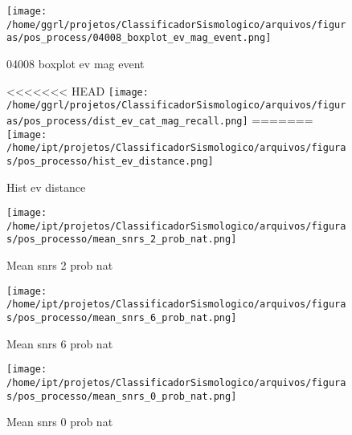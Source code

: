                     \begin{figure}[H]
                        \centering
                        \texttt{[image: /home/ggrl/projetos/ClassificadorSismologico/arquivos/figuras/pos\_process/04008\_boxplot\_ev\_mag\_event.png]}
                        \caption{04008 boxplot ev mag event}
                        \label{fig:04008_boxplot_ev_mag_event}
                    \end{figure}
                

                    \begin{figure}[H]
                        \centering
<<<<<<< HEAD
                        \texttt{[image: /home/ggrl/projetos/ClassificadorSismologico/arquivos/figuras/pos\_process/dist\_ev\_cat\_mag\_recall.png]}
=======
                        \texttt{[image: /home/ipt/projetos/ClassificadorSismologico/arquivos/figuras/pos\_processo/hist\_ev\_distance.png]}
                        \caption{Hist ev distance}
                        \label{fig:hist_ev_distance}
                    \end{figure}
                

                    \begin{figure}[H]
                        \centering
                        \texttt{[image: /home/ipt/projetos/ClassificadorSismologico/arquivos/figuras/pos\_processo/mean\_snrs\_2\_prob\_nat.png]}
                        \caption{Mean snrs 2 prob nat}
                        \label{fig:mean_snrs_2_prob_nat}
                    \end{figure}
                

                    \begin{figure}[H]
                        \centering
                        \texttt{[image: /home/ipt/projetos/ClassificadorSismologico/arquivos/figuras/pos\_processo/mean\_snrs\_6\_prob\_nat.png]}
                        \caption{Mean snrs 6 prob nat}
                        \label{fig:mean_snrs_6_prob_nat}
                    \end{figure}
                

                    \begin{figure}[H]
                        \centering
                        \texttt{[image: /home/ipt/projetos/ClassificadorSismologico/arquivos/figuras/pos\_processo/mean\_snrs\_0\_prob\_nat.png]}
                        \caption{Mean snrs 0 prob nat}
                        \label{fig:mean_snrs_0_prob_nat}
                    \end{figure}
                

